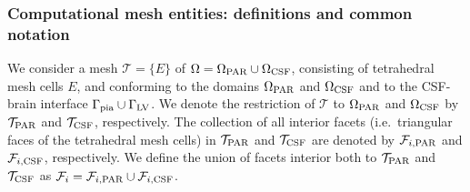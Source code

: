 \documentclass[fleqn,10pt]{wlscirep}
\begin{document}
\subsubsection{Computational mesh entities: definitions and common notation}

We consider a mesh $\mathcal{T} = \{ E \}$ of $\Omega = \Omega_{\rm
  PAR} \cup \Omega_{\rm CSF}$, consisting of tetrahedral mesh cells
$E$, and conforming to the domains $\Omega_{\rm PAR}$ and $\Omega_{\rm
  CSF}$ and to the CSF-brain interface $\Gamma_{\rm pia} \cup
\Gamma_{\rm LV}$. We denote the restriction of $\mathcal{T}$ to
$\Omega_{\rm PAR}$ and $\Omega_{\rm CSF}$ by $\mathcal{T}_{\rm PAR}$
and $\mathcal{T}_{\rm CSF}$, respectively. The collection of all
interior facets (i.e.~triangular faces of the tetrahedral mesh cells)
in $\mathcal{T}_{\rm PAR}$ and $\mathcal{T}_{\rm CSF}$ are denoted by
$\mathcal{F}_{i, \rm PAR}$ and $\mathcal{F}_{i, \rm CSF}$,
respectively. We define the union of facets interior both to
$\mathcal{T}_{ \rm PAR}$ and $\mathcal{T}_{ \rm CSF}$ as
$\mathcal{F}_i = \mathcal{F}_{i, \rm PAR} \cup \mathcal{F}_{i, \rm
  CSF}$. 
\end{document}
